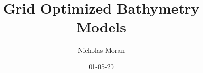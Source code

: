 
\usepackage[utf8]{inputenc}
\usepackage[english]{babel}
\usepackage[
    backend=biber,
    style=alphabetic,
    sorting=ynt
    ]{biblatex}



%
%



%
%

\title{Grid Optimized Bathymetry Models}
\author{Nicholas Moran}
\date{01-05-20}
\maketitle









\printbibliography


%
%

%
%



 
